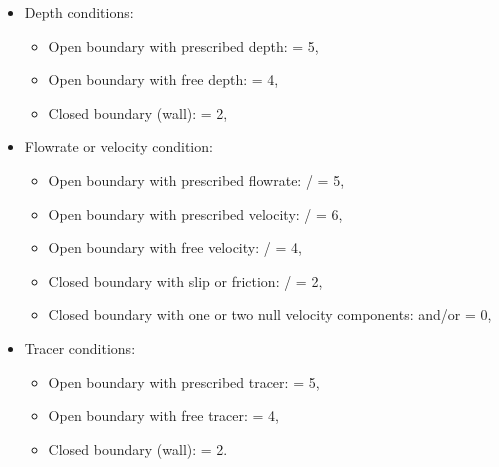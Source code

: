 \begin{itemize}
\item Depth conditions:

\begin{itemize}

\item Open boundary with prescribed depth:  = 5,

\item Open boundary with free depth:  = 4,

\item Closed boundary (wall):  = 2,
\end{itemize}

\item Flowrate or velocity condition:

\begin{itemize}

\item Open boundary with prescribed flowrate: /
= 5,

\item Open boundary with prescribed velocity: /
= 6,

\item Open boundary with free velocity: / = 4,

\item Closed boundary with slip or friction: /
= 2,

\item Closed boundary with one or two null velocity components: 
and/or  = 0,
\end{itemize}

\item Tracer conditions:

\begin{itemize}

\item Open boundary with prescribed tracer:  = 5,

\item Open boundary with free tracer:  = 4,

\item Closed boundary (wall):  = 2.
\end{itemize}

\end{itemize}

